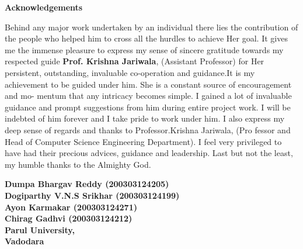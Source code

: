 \thispagestyle{empty}
\newpage
\cleardoublepage{}
{}
\begin{center}
{\Large \bf Acknowledgements}\\
\end{center}
\vspace{10pt}
\begin{flushright}
\end{flushright}


Behind any major work undertaken by an individual there lies the contribution of the people
who helped him to cross all the hurdles to achieve Her goal. It gives me the immense pleasure to
express my sense of sincere gratitude towards my respected guide \textbf{Prof. Krishna Jariwala},
(Assistant Professor) for Her persistent, outstanding, invaluable co-operation and guidance.It is my
achievement to be guided under him. She is a constant source of encouragement and mo- mentum
that any intricacy becomes simple. I gained a lot of invaluable guidance and prompt suggestions
from him during entire project work. I will be indebted of him forever and I take pride to work
under him. I also express my deep sense of regards and thanks to Professor.Krishna Jariwala, (Pro
fessor and Head of Computer Science Engineering Department). I feel very privileged to have had
their precious advices, guidance and leadership. Last but not the least, my humble thanks to the
Almighty God.


\vspace{1.5cm}
\begin{flushright}
\textbf{Dumpa Bhargav Reddy (200303124205) \\ Dogiparthy V.N.S Srikhar (200303124199) \\ Ayon Karmakar (200303124271) \\ Chirag Gadhvi (200303124212) \\ Parul University, \\ Vadodara}\\ 
\end{flushright}